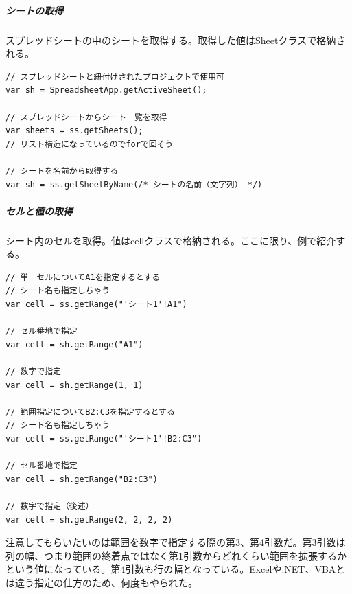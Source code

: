 \documentclass[dvipdfmx,jb5]{jarticle}
\begin{document}
\subparagraph{シートの取得}
スプレッドシートの中のシートを取得する。取得した値はSheetクラスで格納される。
\begin{lstlisting}
// スプレッドシートと紐付けされたプロジェクトで使用可
var sh = SpreadsheetApp.getActiveSheet();

// スプレッドシートからシート一覧を取得
var sheets = ss.getSheets();
// リスト構造になっているのでforで回そう

// シートを名前から取得する
var sh = ss.getSheetByName(/* シートの名前（文字列） */)
\end{lstlisting}

\subparagraph{セルと値の取得}
シート内のセルを取得。値はcellクラスで格納される。ここに限り、例で紹介する。
\begin{lstlisting}
// 単一セルについてA1を指定するとする
// シート名も指定しちゃう
var cell = ss.getRange("'シート1'!A1")

// セル番地で指定
var cell = sh.getRange("A1")

// 数字で指定
var cell = sh.getRange(1, 1)

// 範囲指定についてB2:C3を指定するとする
// シート名も指定しちゃう
var cell = ss.getRange("'シート1'!B2:C3")

// セル番地で指定
var cell = sh.getRange("B2:C3")

// 数字で指定（後述）
var cell = sh.getRange(2, 2, 2, 2)

\end{lstlisting}
注意してもらいたいのは範囲を数字で指定する際の第3、第4引数だ。第3引数は列の幅、つまり範囲の終着点ではなく第1引数からどれくらい範囲を拡張するかという値になっている。第4引数も行の幅となっている。Excelや.NET、VBAとは違う指定の仕方のため、何度もやられた。
\end{document}
